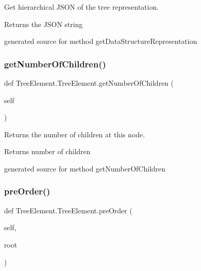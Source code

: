 Get hierarchical J\+S\+ON of the tree representation. 

\begin{DoxyReturn}{Returns}
the J\+S\+ON string\begin{DoxyVerb}generated source for method getDataStructureRepresentation \end{DoxyVerb}
 
\end{DoxyReturn}
\hypertarget{class_tree_element_1_1_tree_element_a927788740a1a6ada175c22cf11d20e6b}{}\label{class_tree_element_1_1_tree_element_a927788740a1a6ada175c22cf11d20e6b} 
\subsubsection{\texorpdfstring{get\+Number\+Of\+Children()}{getNumberOfChildren()}}
{\footnotesize\ttfamily def Tree\+Element.\+Tree\+Element.\+get\+Number\+Of\+Children (\begin{DoxyParamCaption}\item[{}]{self }\end{DoxyParamCaption})}



Returns the number of children at this node. 

\begin{DoxyReturn}{Returns}
number of children \begin{DoxyVerb}generated source for method getNumberOfChildren \end{DoxyVerb}
 
\end{DoxyReturn}
\hypertarget{class_tree_element_1_1_tree_element_a748905d6bd1a29c0e1de3609781afa7c}{}\label{class_tree_element_1_1_tree_element_a748905d6bd1a29c0e1de3609781afa7c} 
\subsubsection{\texorpdfstring{pre\+Order()}{preOrder()}}
{\footnotesize\ttfamily def Tree\+Element.\+Tree\+Element.\+pre\+Order (\begin{DoxyParamCaption}\item[{}]{self,  }\item[{}]{root }\end{DoxyParamCaption})}



